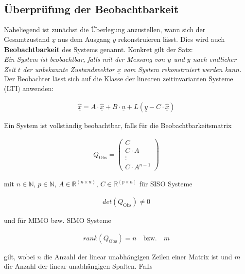 \documentclass[
	pagesize,
	fontsize=12pt,
	paper=a4,
	oneside,
   reqno
]{scrartcl}
\newcommand{\bzw}{bzw.\xspace}
\begin{document}
\subsection{Überprüfung der Beobachtbarkeit}

Naheliegend ist zunächst die Überlegung anzustellen, wann sich der Gesamtzustand $\underline{x}$ aus dem Ausgang $\underline{y}$ rekonstruieren lässt. Dies wird auch \textbf{Beobachtbarkeit} des Systems genannt. Konkret gilt der Satz: \\
\newline
\textit{Ein System ist beobachtbar, falls mit der Messung von $\underline{u}$ und $\underline{y}$ nach endlicher Zeit $t$ der unbekannte Zustandsvektor $\underline{x}$ vom System rekonstruiert werden kann.} \\
\newline
Der Beobachter lässt sich auf die Klasse der linearen zeitinvarianten Systeme (LTI) anwenden:

\begin{align}
    \underline{\dot{\hat{x}}} = A \cdot \underline{\hat{x}} + B \cdot \underline{u} + L \left( \underline{y} - C \cdot \underline{\hat{x}}\right)
\end{align}

Ein System ist vollständig beobachtbar, falls für die Beobachtbarkeitsmatrix

\begin{align}
    Q_{\mathrm{Obs}} =
    \begin{pmatrix}
        C \\
        C \cdot A \\
        \vdots \\
        C \cdot A^{n - 1}
    \end{pmatrix}
\end{align}

mit $n\in\mathbb{N}$, $p\in\mathbb{N}$, $A\in\mathbb{R}^{(n\times n)}$, $C\in\mathbb{R}^{(p\times n)}$ für SISO Systeme

\begin{align}
    det(Q_{\mathrm{Obs}}) \neq 0
\end{align}

und für MIMO \bzw SIMO Systeme

\begin{align}
    rank(Q_{\mathrm{Obs}}) = n \quad \text{\bzw} \quad m
\end{align}

gilt, wobei $n$ die Anzahl der linear unabhängigen Zeilen einer Matrix ist und $m$ die Anzahl der linear unabhängigen Spalten. Falls
\end{document}
